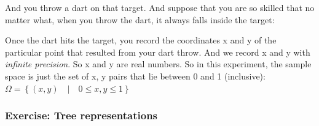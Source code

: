 \documentclass[pdftex, brazil, 12pt, twoside]{article}
\begin{document}
And you throw a dart on that target.
And suppose that you are so skilled that no matter what,
when you throw the dart, it always
falls inside the target:

\begin{figure}[H]
  \begin{center}
  \end{center}
\end{figure}

Once the dart hits the target, you record the coordinates x
and y of the particular point that resulted
from your dart throw.
And we record x and y with \emph{infinite precision}.
So x and y are real numbers.
So in this experiment, the sample space is just the set
of x, y pairs that lie between 0 and 1 (inclusive):
$\Omega = \left\{(x, y)\quad |\quad 0 \le x, y \le 1\right\}$

\subsubsection{Exercise: Tree representations}
\label{un1-lec1-exec-tree-rep}
\end{document}

